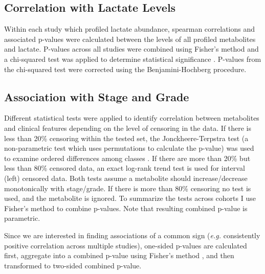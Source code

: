 \documentclass[10pt]{article}
\newcommand{\beginsupplement}{%
        \setcounter{table}{0}
        \renewcommand{\thetable}{S\arabic{table}}%
        \setcounter{figure}{0}
        \renewcommand{\thefigure}{S\arabic{figure}}%
     }
\begin{document}
\subsection{Correlation with Lactate Levels}
Within each study which profiled lactate abundance, spearman correlations and associated p-values were calculated between the levels of all profiled metabolites and lactate. P-values across all studies were combined using Fisher's method and a chi-squared test was applied to determine statistical significance \cite{Whitlock2005}. P-values from the chi-squared test were corrected using the Benjamini-Hochberg procedure.

\subsection{Association with Stage and Grade}
Different statistical tests were applied to identify correlation between metabolites and clinical features depending on the level of censoring in the data. If there is less than 20\% censoring within the tested set, the Jonckheere-Terpstra test (a non-parametric test which uses permutations to calculate the p-value) was used to examine ordered differences among classes . If there are more than 20\% but less than 80\% censored data, an exact log-rank trend test is used for interval (left) censored data. Both tests assume a metabolite should increase/decrease monotonically with stage/grade.  If there is more than 80\% censoring no test is used, and the metabolite is ignored. To summarize the tests across cohorts I use Fisher’s method to combine p-values. Note that resulting combined p-value is parametric. 

Since we are interested in finding associations of a common sign (\textit{e.g.} consistently positive correlation across multiple studies), one-sided p-values are calculated first, aggregate into a combined p-value using Fisher's method \cite{Whitlock2005}, and then transformed to two-sided combined p-value.




\beginsupplement
\newpage
\end{document}
